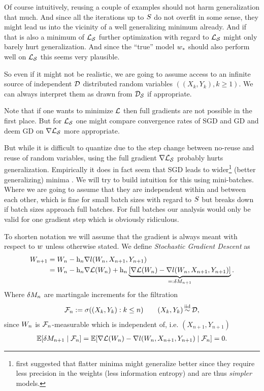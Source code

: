 Of course intuitively, reusing a couple of examples should not harm
generalization that much. And since all the iterations up to \(S\)
do not overfit in some sense, they might lead us into the vicinity of a well
generalizing minimum already. And if that is also a minimum of \(\mathcal{L}_{\mathcal{S}}\)
further optimization with regard to \(\mathcal{L}_{\mathcal{S}}\) might only barely hurt
generalization. And since the ``true'' model \(w_*\) should also perform
well on \(\mathcal{L}_{\mathcal{S}}\) this seems very plausible.

So even if it might not be realistic, we are going to assume access to an infinite
source of independent \(\mathcal{D}\) distributed random variables \(((X_k,Y_k), k\ge 1)\).
We can always interpret them as drawn from \(\mathcal{D}_{\mathcal{S}}\) if appropriate.

Note that if one wants to minimize \(\mathcal{L}\) then full gradients are not possible in
the first place. But for \(\mathcal{L}_{\mathcal{S}}\) one might compare convergence rates
of SGD and GD and deem GD on \(\nabla\mathcal{L}_{\mathcal{S}}\) more appropriate.

But while it
is difficult to quantize due to the step change between no-reuse and reuse of
random variables, using the full gradient \(\nabla\mathcal{L}_{\mathcal{S}}\) probably hurts
generalization. Empirically it does in fact
seem that SGD leads to wider\footnote{
\textcite{hochreiterFlatMinima1997} first suggested that flatter minima might
	generalize better since they require less precision in the weights (less
	information entropy) and are thus \emph{simpler} models.
}
(better generalizing) minima \parencite{liVisualizingLossLandscape2018}.
We will try to build intuition for this using mini-batches. Where we
are going to assume that they are independent within and between each other,
which is fine for small batch sizes with regard to \(S\) but breaks
down if batch sizes approach full batches. For full batches our analysis would
only be valid for one gradient step which is obviously ridiculous.

To shorten notation we will assume that the gradient is always meant
with respect to \(w\) unless otherwise stated.
We define \emph{Stochastic Gradient Descent} as
%
\begin{align*}
	W_{n+1}
	&= W_n - \text{h}_n\nabla l(W_n, X_{n+1},Y_{n+1})\\
	&= W_n - \text{h}_n\nabla\mathcal{L}(W_n)
	+ \text{h}_n\underbrace{
		[\nabla\mathcal{L}(W_n) - \nabla l(W_n, X_{n+1}, Y_{n+1})]
	}_{=:\delta M_{n+1}}.
\end{align*}
Where \(\delta M_n\) are martingale increments for the filtration
\begin{align*}
	\filtration_n :=\sigma((X_k, Y_k): k\le n )
	\qquad (X_k,Y_k)\stackrel{\text{iid}}{\sim}\dist,
\end{align*}
since \(W_n\) is \(\mathcal{F}_n\)-measurable which is independent of, i.e.
\((X_{n+1},Y_{n+1})\)
\begin{align}\label{eq: conditional independence of martingale increments}
	\mathbb{E}[\delta M_{n+1}\mid \mathcal{F}_n]
	= \mathbb{E}[\nabla\mathcal{L}(W_n) - \nabla l(W_n, X_{n+1}, Y_{n+1})\mid \mathcal{F}_n]
	= 0.
\end{align}
%
